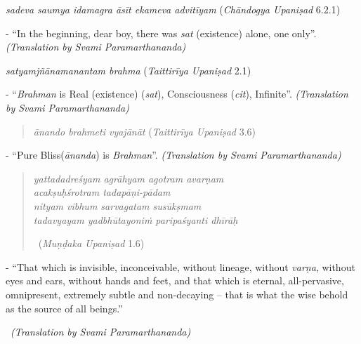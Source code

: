 \textit{sadeva saumya idamagra āsīt ekameva advitīyam } (\textit{Chāndogya Upaniṣad} 6.2.1)

\begin{myquote}
- ``In the beginning, dear boy, there was \textit{sat} (existence) alone, one only”. \textit{(Translation by Svami Paramarthananda)}
\end{myquote}

\textit{satyamjñānamanantam brahma } (\textit{Taittirīya Upaniṣad} 2.1)

\begin{myquote}
- ``\textit{Brahman} is Real (existence) (\textit{sat}), Consciousness (\textit{cit}), Infinite''. \textit{(Translation by Svami Paramarthananda)}
\end{myquote}

\begin{verse}
\textit{ānando brahmeti vyajānāt } (\textit{Taittirīya Upaniṣad} 3.6)
\end{verse}

\begin{myquote}
- ``Pure Bliss(\textit{ānanda}) is \textit{Brahman}”. \textit{(Translation by Svami Paramarthananda)}
\end{myquote}

\begin{verse}
\textit{yattadadreśyam agrāhyam agotram avarṇam}\\ \textit{acakṣuḥśrotram tadapāṇi-pādam }\\ \textit{nityam vibhum sarvagatam susūkṣmam}\\ \textit{tadavyayam yadbhūtayoniṁ paripaśyanti dhīrāḥ } 

~\hfill (\textit{Muṇḍaka Upaniṣad} 1.6)
\end{verse}

\begin{myquote}
- ``That which is invisible, inconceivable, without lineage, without \textit{varṇa}, without eyes and ears, without hands and feet, and that which is eternal, all-pervasive, omnipresent, extremely subtle and non-decaying – that is what the wise behold as the source of all beings.” 

~\hfill \textit{(Translation by Svami Paramarthananda)}
\end{myquote}

